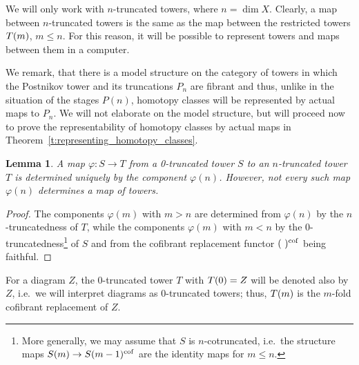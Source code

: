 \documentclass[12pt,a4wide]{article}
\theoremstyle{plain}
\newtheorem{lemma}[thm]{Lemma}
\theoremstyle{definition}
\newcommand{\cofr}{\mathrm{cof}}
\newcommand{\Pst}[1]{P(#1)}
\newcommand{\Pnewst}{\Pst{\then}}
\newcommand{\towercompmap}[2]{#1(#2)}
\newcommand{\varphin}{\towercompmap{\varphi}{\then}}
\newcommand{\varphim}{\towercompmap{\varphi}{\them}}
\newcommand{\them}{m}
\newcommand{\then}{n}
\newcommand{\thedim}{{n}}
\newcommand{\Pnew}{{P_\thedim}}
\renewcommand\:{\colon}
\begin{document}
We will only work with $\then$-truncated towers, where $\then = \dim X$. Clearly, a map between $\then$-truncated towers is the same as the map between the restricted towers $\towercomp{T}{\them}$, $\them \leq \then$. For this reason, it will be possible to represent towers and maps between them in a computer.

We remark, that there is a model structure on the category of towers in which the Postnikov tower and its truncations $\Pnew$ are fibrant and thus, unlike in the situation of the stages $\Pnewst$, homotopy classes will be represented by actual maps to $\Pnew$. We will not elaborate on the model structure, but will proceed now to prove the representability of homotopy classes by actual maps in Theorem~\ref{t:representing_homotopy_classes}.

\begin{lemma}\label{l:maps_to_n_truncated}
%
A map $\varphi \colon S \to T$ from a 0-truncated tower $S$ to an $\then$-truncated tower $T$ is determined uniquely by the component $\towercompmap{\varphi}{\then}$. However, not every such map $\towercompmap{\varphi}{\then}$ determines a map of towers.
\end{lemma}

\begin{proof}
The components $\varphim$ with $\them > \then$ are determined from $\varphin$ by the $\then$-truncatedness of $T$, while the components $\varphim$ with $\them < \then$ by the 0-truncatedness\footnote{
	More generally, we may assume that $S$ is $\then$-cotruncated, i.e.\ the structure maps $\towercomp{S}{\them} \to \cofrst{\towercomp{S}{\them-1}}$ are the identity maps for $\them \leq \then$.
} of $S$ and from the cofibrant replacement functor $\cofrst{(\ )}$ being faithful.
\end{proof}

For a diagram $Z$, the 0-truncated tower $T$ with $T(0) = Z$ will be denoted also by $Z$, i.e.\ we will interpret diagrams as 0-truncated towers; thus, $\towercomp{T}{\them}$ is the $\them$-fold cofibrant replacement of $Z$.

\end{document}
